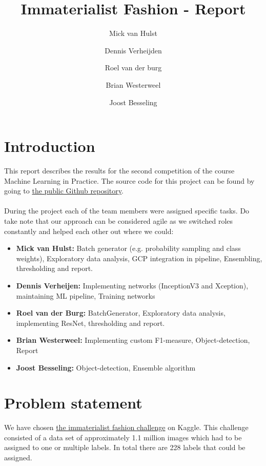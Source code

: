 \documentclass[10pt, a4paper]{article}
\title{Immaterialist Fashion - Report}
\author{Mick van Hulst \and Dennis Verheijden \and Roel van der burg \and Brian Westerweel \and Joost Besseling}
\begin{document}
	\maketitle
	
	\begin{multicols}{2}
	
	    \section{Introduction}
	    This report describes the results for the second competition of the course Machine Learning in Practice. The source code for this project can be found by going to \href{https://github.com/mickvanhulst/imaterialist_kaggle}{the public Github repository}.
	    \\
	    \\
	    During the project each of the team members were assigned specific tasks. Do take note that our approach can be considered agile as we switched roles constantly and helped each other out where we could:
	    \begin{itemize}
	        \item \textbf{Mick van Hulst:} Batch generator (e.g. probability sampling and class weights), Exploratory data analysis, GCP integration in pipeline, Ensembling, thresholding and report.
	        \item \textbf{Dennis Verheijen:} Implementing networks (InceptionV3 and Xception), maintaining ML pipeline, Training networks 
	        \item \textbf{Roel van der Burg:} BatchGenerator, Exploratory data analysis, implementing ResNet, thresholding and report.
	        \item \textbf{Brian Westerweel:} Implementing custom F1-measure, Object-detection, Report
	        \item \textbf{Joost Besseling:} Object-detection, Ensemble algorithm
	    \end{itemize}
		
		\section{Problem statement}
		We have chosen \href{https://www.kaggle.com/c/imaterialist-challenge-fashion-2018}{the immaterialist fashion challenge} on Kaggle. This challenge consisted of a data set of approximately 1.1 million images which had to be assigned to one or multiple labels. In total there are 228 labels that could be assigned.
		

\end{multicols}
\end{document}
